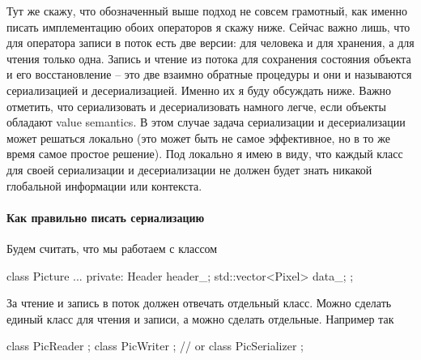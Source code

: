 Тут же скажу, что обозначенный выше подход не совсем грамотный, как именно писать имплементацию обоих операторов я скажу ниже.
Сейчас важно лишь, что для оператора записи в поток есть две версии: для человека и для хранения, а для чтения только одна.
Запись и чтение из потока для сохранения состояния объекта и его восстановление -- это две взаимно обратные процедуры и они и называются сериализацией и десериализацией.
Именно их я буду обсуждать ниже.
Важно отметить, что сериализовать и десериализовать намного легче, если объекты обладают value semantics.
В этом случае задача сериализации и десериализации может решаться локально (это может быть не самое эффективное, но в то же время самое простое решение).
Под локально я имею в виду, что каждый класс для своей сериализации и десериализации не должен будет знать никакой глобальной информации или контекста.

\paragraph{Как правильно писать сериализацию}

Будем считать, что мы работаем с классом
\begin{cppcode}
class Picture {
  ...
private:
  Header header_;
  std::vector<Pixel> data_;
};
\end{cppcode}
За чтение и запись в поток должен отвечать отдельный класс.
Можно сделать единый класс для чтения и записи, а можно сделать отдельные.
Например так
\begin{cppcode}
class PicReader {};
class PicWriter {};
// or
class PicSerializer {};
\end{cppcode}

